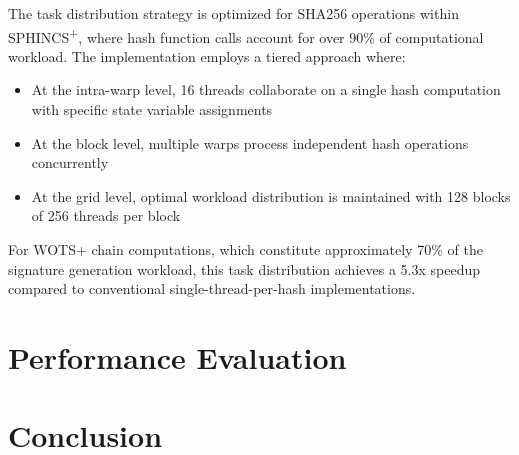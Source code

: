 \documentclass[journal]{IEEEtran}
\begin{document}
The task distribution strategy is optimized for SHA256 operations within SPHINCS\textsuperscript{+}, where hash function calls account for over 90\% of computational workload. The implementation employs a tiered approach where:

\begin{itemize}
  \item At the intra-warp level, 16 threads collaborate on a single hash computation with specific state variable assignments
  \item At the block level, multiple warps process independent hash operations concurrently
  \item At the grid level, optimal workload distribution is maintained with 128 blocks of 256 threads per block
\end{itemize}

For WOTS+ chain computations, which constitute approximately 70\% of the signature generation workload, this task distribution achieves a 5.3x speedup compared to conventional single-thread-per-hash implementations.

\section{Performance Evaluation}\label{sec:evaluation}

\section{Conclusion}\label{sec:conclusion}



\end{document}
